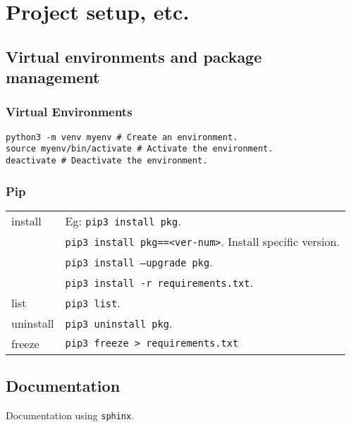 \section{Project setup, etc.}

\subsection{Virtual environments and package management}

\subsubsection{Virtual Environments}

\begin{mdframed}[backgroundcolor=gray!10,linecolor=Firebrick4]
\begin{verbatim}
python3 -m venv myenv # Create an environment.
source myenv/bin/activate # Activate the environment.
deactivate # Deactivate the environment.
\end{verbatim}
\end{mdframed}


\subsubsection*{Pip}

\begin{tabularx}{\linewidth}{lX}
    install     & Eg: \texttt{pip3 install pkg}.\\
                & \texttt{pip3 install pkg==<ver-num>}. Install specific version.\\
                & \texttt{pip3 install --upgrade pkg}.\\
                & \texttt{pip3 install -r requirements.txt}.\\
    list        & \texttt{pip3 list}.\\
    uninstall   & \texttt{pip3 uninstall pkg}.\\
    freeze      & \texttt{pip3 freeze > requirements.txt}\\
\end{tabularx}


\subsection{Documentation}

Documentation using \texttt{sphinx}.\\

